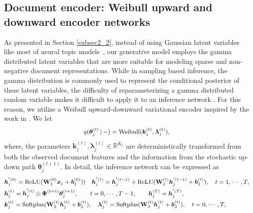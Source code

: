 \documentclass{article}
\newcommand{\Wmat}[0]{\ensuremath{{\bf W}} }
\newcommand{\bv}[0]{\ensuremath{\boldsymbol{b}} }
\newcommand{\hv}[0]{\ensuremath{\boldsymbol{h}} }
\newcommand{\kv}[0]{\ensuremath{\boldsymbol{k}} }
\newcommand{\xv}[0]{\ensuremath{\boldsymbol{x}} }
\newcommand{\lambdav}[0]{\ensuremath{\boldsymbol{\lambda}} }
\newcommand{\given}{\,|\,}
\begin{document}
\subsection{Document encoder: Weibull upward and downward encoder networks}


As presented in Section \ref{subsec2_2}, instead of using Gaussian latent variables like most of neural topic models~\cite{srivastava2017autoencoding}, our generative model employs the gamma distributed latent variables that are more suitable for modeling sparse and non-negative document representations. 
While in sampling based inference, the gamma distribution is commonly used to represent the conditional posterior of these latent variables, 
the difficulty of reparameterizing a gamma distributed random variable makes it difficult to apply it to an inference network \cite{Fan2020bayesian,Zhang2021bayesian}. 
For this reason, we utilize a Weibull upward-downward variational encoder inspired by the work in \citet{zhang2018whai, zhang2020deep}. We let
\begin{equation} \label{eq_Weibull}
\small
\begin{split} 
q(\bm{\theta} _j^{(t)}\given - ) = \mbox{Weibull}(\bm{k}_j^{(t)},\bm{\lambda} _j^{(t)}),
\end{split}
\end{equation}
where, the parameters $\bm{k}_j^{(t)},\bm{\lambda} _j^{(t)} \in {\mathbb{R}^{{K_t}}}$ are deterministically transformed from both the observed document features and the information from the stochastic up-down path $\bm{\theta} _j^{(t+1)}$. In detail, the inference network can be expressed as
\begin{equation} \label{eq_pgcn} \small
\begin{split}
& \hv_j^{'(0)} = \mbox{ReLU}(\Wmat_1^{(0)}\xv_j + \bv_1^{(0)}))  \quad \hv_j^{'(t)}= \hv_j^{'(t - 1)} + \mbox{ReLU}(\Wmat_1^{(t)}\hv_j^{'(t - 1)} + \bv_1^{(t)}), \quad t=1, \cdots, T, \\ 
& \hv_j^{(t)} = \hv_j^{'(t)} \oplus \bm{\Phi}^{(t+1)} \bm{\theta}_j^{(t+1)}, \quad\quad  t=0, \cdots, T-1, \quad\quad \hv_j^{(T)} = \hv_j^{'(T)} ,\quad  \\
&\kv_j^{(t)}= \mbox{Softplus}(\Wmat_2^{(t)}\hv_j^{(t)} + \bv_2^{(t)}), \quad \lambdav _j^{(t)}= \mbox{Softplus}(\Wmat_3^{(t)}\hv_j^{(t)} + \bv_3^{(t)}), \quad t=0, \cdots, T,
\end{split}
\end{equation}
\end{document}
